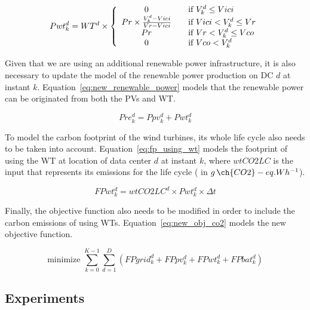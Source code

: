 \begin{equation} \label{eq:wt_power_prod}
Pwt^d_{k} = WT^d \times \left\{ 
  \begin{array}{ c l }
    0   & \quad \textrm{if } V^d_k \leq Vici \\
    Pr \times \frac{V^d_k - Vici}{Vr - Vici}  & \quad \textrm{if } Vici < V^d_k \leq Vr \\
    Pr  & \quad \textrm{if } Vr < V^d_k \leq Vco \\
    0  & \quad \textrm{if } Vco < V^d_k \\
  \end{array}
\right.
\end{equation}


Given that we are using an additional renewable power infrastructure, it is also necessary to update the model of the renewable power production on DC $d$ at instant $k$. Equation~\eqref{eq:new_renewable_power} models that the renewable power can be originated from both the PVs and WT.

\begin{equation} \label{eq:new_renewable_power}
    Pre^d_{k}= Ppv^d_{k} + Pwt^d_{k}
\end{equation}


To model the carbon footprint of the wind turbines, its whole life cycle also needs to be taken into account. Equation~\eqref{eq:fp_using_wt} models the footprint of using the WT at location of data center $d$ at instant $k$, where $wtCO2LC$ is the input that represents its emissions for the life cycle ( in $g\,\ch{CO2}-eq.Wh^{-1}$).

\begin{equation}\label{eq:fp_using_wt}
   FPwt^d_k =  wtCO2LC^d \times Pwt^d_{k}\times \Delta t
\end{equation}

Finally, the objective function also needs to be modified in order to include the carbon emissions of using WTs. Equation~\ref{eq:new_obj_co2} models the new objective function.

\begin{equation} \label{eq:new_obj_co2}
  \text{minimize }\sum_{k=0}^{K-1} \sum_{d=1}^D ( FPgrid^d_k +  FPpv^d_k +  FPwt^d_k + FPbat^d_k) 
\end{equation}

\subsection{Experiments}

